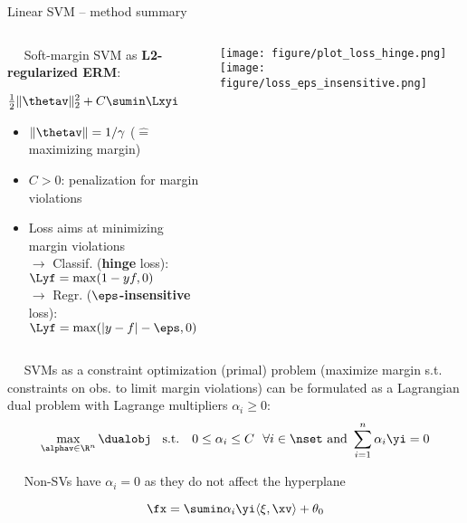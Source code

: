\begin{vbframe}{Linear SVM -- method summary}
\begin{columns}[T, totalwidth = \textwidth]
\begin{column}{0.61\textwidth}
 ~~ Soft-margin SVM as \textbf{L2-regularized ERM}: 
     \centerline{$\frac{1}{2} \|\thetav\|_2^2 + C \sumin \Lxyi$}
     \vspace{-\topsep}
  \begin{itemize}
  \setlength{\parskip}{0pt} 
  \setlength{\itemsep}{0pt plus 1pt}
    \item $\|\thetav\| = 1 / \gamma$ ($\hat{=}$ maximizing margin) \\
    \item $C > 0$: penalization for margin violations
    \item Loss aims at minimizing margin violations\\
    $\rightarrow$ Classif. (\textbf{hinge} loss): $\Lyf = \max(1-yf, 0)$ \\
    $\rightarrow$ Regr. (\textbf{$\eps$-insensitive} loss):   $\Lyf = \max(|y-f| - \eps, 0)$ 
  \end{itemize}
\vspace{-\topsep}
\end{column}
\begin{column}{0.38\textwidth}
  \centering
  \texttt{[image: 
  figure/plot\_loss\_hinge.png]}
  \texttt{[image: 
  figure/loss\_eps\_insensitive.png]}

\end{column}
\end{columns}

\medskip

 ~~ %
SVMs as a constraint optimization (primal) problem (maximize margin s.t. constraints on obs. to limit margin violations) can be formulated as a Lagrangian dual problem with Lagrange multipliers $\alpha_i \geq 0$: %
$$\max\limits_{\alphav \in \R^n} \dualobj \;\; \text{ s.t. } \;\; 0 \le \alpha_i \le C ~~ \forall i \in \nset \text{ and } \sum_{i=1}^n \alpha_i \yi = 0$$


 ~~ 
Non-SVs have $\alpha_i = 0$ as they do not affect the hyperplane

$$\fx = \sumin \alpha_i \yi \langle \xi, \xv \rangle  + \theta_0$$


\end{vbframe}
